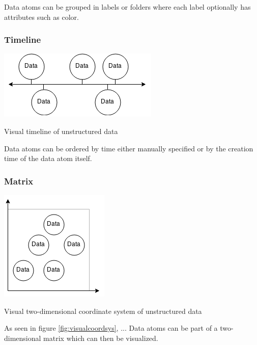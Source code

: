Data atoms can be grouped in labels or folders where each label optionally has attributes such as color.

\subsubsection{Timeline}

\begin{flfigure}
  \centering
    \includegraphics[width=0.5\linewidth]{00_resources/data_timeline.png}
    \caption{Visual timeline of unstructured data}
  \label{fig:visualtimeline}
\end{flfigure}

Data atoms can be ordered by time either manually specified or by the creation time of the data atom itself.

\subsubsection{Matrix}

\begin{flfigure}
  \centering
    \includegraphics[width=0.5\linewidth]{00_resources/data_matrix.png}
    \caption{Visual two-dimensional coordinate system of unstructured data}
  \label{fig:visualcoordsys}
\end{flfigure}

As seen in figure \ref{fig:visualcoordsys}, ...
Data atoms can be part of a two-dimensional matrix which can then be visualized.
